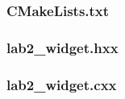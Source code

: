 \documentclass[a4paper,12pt,notitlepage,headsepline,pdftex]{scrartcl}
\begin{document}
    \subsubsection{CMakeLists.txt}
      
    \subsubsection{lab2\_widget.hxx}
      
    \subsubsection{lab2\_widget.cxx}
      
\end{document}
